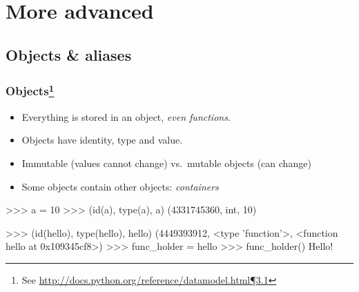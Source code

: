 \documentclass[xetex,10pt]{beamer}
\def\spacer{\vspace*{1em}}
\begin{document}
\section{More advanced}

\subsection{Objects \& aliases}

\begin{frame}[fragile]
	\frametitle{Objects\footnote[frame]{See \href{http://docs.python.org/reference/datamodel.html\#objects-values-and-types}{http://docs.python.org/reference/datamodel.html¶3.1}}}

	\begin{itemize}
		\item Everything is stored in an object, \emph{even functions}.
		\pause
		\item Objects have identity, type and value.
		\pause
		\item Immutable (values cannot change) vs.\ mutable objects (can change)
		\pause
		\item Some objects contain other objects: \emph{containers}
	\end{itemize}
	
	\spacer
	
	
	\begin{python}
	>>> a = 10
	>>> (id(a), type(a), a)
	(4331745360, int, 10)
	\end{python}
	
	\pause	

	\begin{python}
	>>> (id(hello), type(hello), hello)
	(4449393912, <type 'function'>, <function hello at 0x109345cf8>)
	>>> func_holder = hello
	>>> func_holder()
	Hello!
	\end{python}


\end{frame}
\end{document}
